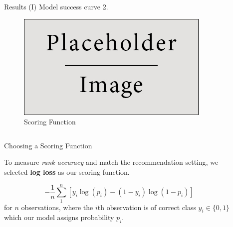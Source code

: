 \documentclass[final]{beamer}
\newlength{\sepwid}
\newlength{\onecolwid}
\newlength{\twocolwid}
\begin{document}
\begin{frame}[t]
\begin{columns}[t]
\begin{column}{\twocolwid}
\begin{columns}[t, totalwidth=\twocolwid]
\begin{column}{\onecolwid}\vspace{-.6in.}
\begin{block}{Results (I)}
Model success curve 2.
\begin{figure}
\includegraphics[width=\linewidth]{placeholder.jpg}
\caption{Scoring Function}
\end{figure}
\end{block}
\end{column}

\end{columns}

\begin{alertblock}{Choosing a Scoring Function}

To measure \textit{rank accuracy} and match the 
recommendation setting, 
we selected \textbf{log loss} as our scoring function.

\begin{equation}
-\frac{1}{n} \sum_{1}^{n} [y_i \log(p_i)-(1-y_i)\log(1-p_i)]
\end{equation}
for $n$ observations, where the $i$th observation is of correct class $y_i \in \{0,1\}$ 
which our model assigns probability $p_i$.

\end{alertblock}



\end{column} %

\begin{column}{\sepwid}\end{column} %

\begin{column}{\onecolwid} %



\end{column}
\end{columns}
\end{frame}
\end{document}
